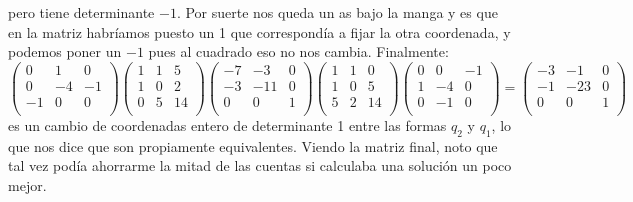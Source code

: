 \documentclass[12pt]{amsart}
\newcommand{\lp}{\left(}
\newcommand{\rp}{\right)}
\theoremstyle{plain}
\begin{document}
pero tiene determinante $-1$. Por suerte nos queda un as 
bajo la manga y es que en la matriz habríamos puesto un 1
que correspondía a fijar la otra coordenada, y podemos poner
un $-1$ pues al cuadrado eso no nos cambia. Finalmente:
$$\lp\begin{matrix}
    0&1&0 \\
    0&-4&-1 \\
    -1&0&0 \\
\end{matrix}\rp
\lp\begin{matrix}
    1&1&5 \\
    1&0&2 \\
    0&5&14 \\
\end{matrix}\rp
\lp\begin{matrix}
    -7&-3&0 \\
    -3&-11&0 \\
    0&0&1 \\
\end{matrix}\rp
\lp\begin{matrix}
    1&1&0 \\
    1&0&5 \\
    5&2&14 \\
\end{matrix}\rp
\lp\begin{matrix}
    0&0&-1 \\
    1&-4&0 \\
    0&-1&0 \\
\end{matrix}\rp = 
\lp\begin{matrix}
    -3&-1&0 \\
    -1&-23&0 \\
    0&0&1 \\
\end{matrix}\rp$$
es un cambio de coordenadas entero de determinante 1 entre
las formas $q_2$ y $q_1$, lo que nos dice que son propiamente
equivalentes. Viendo la matriz final, noto que tal vez podía 
ahorrarme la mitad de las cuentas si calculaba una solución 
un poco mejor.


\end{document}

